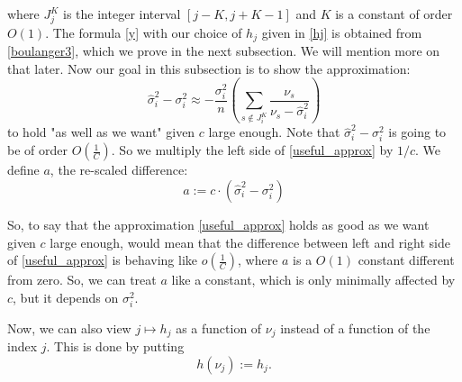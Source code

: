 \documentclass[12pt]{amsart}
\theoremstyle{definition}
\numberwithin{equation}{section}
\numberwithin{equation}{section}
\theoremstyle{remark}
\numberwithin{equation}{section}
\begin{document}
where $J^K_j$ is the integer interval $[j-K,j+K-1]$ and $K$ is a constant of order $O(1)$.
The formula \ref{y} with our choice of $h_j$ given in \ref{hj} is obtained from \ref{boulanger3}, which we prove in the next subsection. We will mention more on that later. Now our goal in this subsection is to show the approximation:
 \begin{equation}
 \label{useful_approx}
 \hat{\sigma}^2_i-\sigma^2_i\approx-\frac{\sigma^2_i}{n}\left(\sum_{s\notin J^K_i}\frac{\nu_s}{\nu_s-\hat{\sigma}^2_i}\right)
 \end{equation}
 to hold "as well as we want" given $c$ large enough. Note that $\hat{\sigma}^2_i-\sigma^2_i$ is going to be of order $O(\frac{1}{C})$.
 So we multiply the left side of \ref{useful_approx} by $1/c$. We define $a$, the re-scaled difference:
 $$a:=c\cdot \left(\hat{\sigma}^2_i-\sigma^2_i\right)$$

 So, to say that the approximation \ref{useful_approx} holds as good as we want given $c$ large enough, would mean
 that the difference between left and right side of \ref{useful_approx} is behaving like $o(\frac{1}{C})$, where $a$ is a $O(1)$ constant different from zero. So, we can treat $a$ like a constant, which is only minimally affected by $c$, but it depends on $\sigma^2_i$.
 
Now, we can also view $j\mapsto h_j$ as a function of $\nu_j$ instead of a function
of the index $j$. This is done by putting
$$h(\nu_j):=h_j.$$
\end{document}
